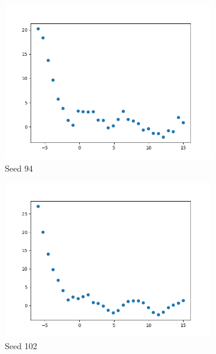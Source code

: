 \documentclass{article}
\begin{document}
\begin{figure}[h!]
	\begin{subfigure}[b]{0.3\linewidth}
		\includegraphics[width=\linewidth]{gp_94.png}
		\caption{Seed 94}
	\end{subfigure}
	\begin{subfigure}[b]{0.3\linewidth}
		\includegraphics[width=\linewidth]{gp_102.png}
		\caption{Seed 102}
	\end{subfigure}
	\begin{subfigure}[b]{0.3\linewidth}

\end{subfigure}
\end{figure}
\end{document}
